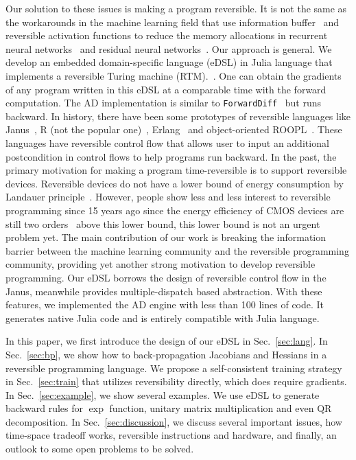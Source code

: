 \documentclass[aps,twocolumn,longbibliography,english,superscriptaddress]{revtex4-1}
\newcommand{\<}{\langle}
\renewcommand{\>}{\rangle}
\newcommand{\Sec}[1]{Sec.~\ref{#1}}
\theoremstyle{definition}\newtheorem{definition}{\textit{Definition}}
\begin{document}

Our solution to these issues is making a program reversible. It is not the same as the workarounds in the machine learning field that use information buffer~\cite{Maclaurin2015} and reversible activation functions to reduce the memory allocations in recurrent neural networks~\cite{MacKay2018} and residual neural networks~\cite{Behrmann2018}. Our approach is general. We develop an embedded domain-specific language (eDSL) in Julia language that implements a reversible Turing machine (RTM).~\cite{Perumalla2013,Frank2017}.
One can obtain the gradients of any program written in this eDSL at a comparable time with the forward computation. The AD implementation is similar to \texttt{ForwardDiff}~\cite{Revels2016} but runs backward.
    In history, there have been some prototypes of reversible languages like Janus~\cite{Lutz1986}, R (not the popular one)~\cite{Frank1997}, Erlang~\cite{Lanese2018} and object-oriented ROOPL~\cite{Haulund2017}. These languages have reversible control flow that allows user to input an additional postcondition in control flows to help programs run backward.
    In the past, the primary motivation for making a program time-reversible is to support reversible devices. Reversible devices do not have a lower bound of energy consumption by Landauer principle~\cite{Landauer1961}. However, people show less and less interest to reversible programming since 15 years ago since the energy efficiency of CMOS devices are still two orders~\cite{Frank2017} above this lower bound, this lower bound is not an urgent problem yet.
    The main contribution of our work is breaking the information barrier between the machine learning community and the reversible programming community, providing yet another strong motivation to develop reversible programming.
    Our eDSL borrows the design of reversible control flow in the Janus, meanwhile provides multiple-dispatch based abstraction. With these features, we implemented the AD engine with less than 100 lines of code. It generates native Julia code and is entirely compatible with Julia language.

    In this paper, we first introduce the design of our eDSL in \Sec{sec:lang}.
    In \Sec{sec:bp}, we show how to back-propagation Jacobians and Hessians in a reversible programming language.
    We propose a self-consistent training strategy in \Sec{sec:train} that utilizes reversibility directly, which does require gradients.
    In \Sec{sec:example}, we show several examples. We use eDSL to generate backward rules for $\exp$ function, unitary matrix multiplication and even QR decomposition.
    In \Sec{sec:discussion}, we discuss several important issues, how time-space tradeoff works, reversible instructions and hardware, and finally, an outlook to some open problems to be solved.
\end{document}
